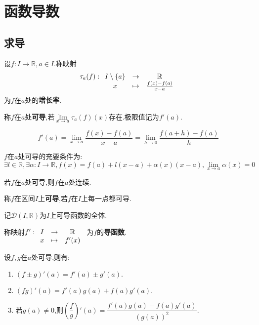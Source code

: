 \chapter{函数导数}

\section{求导}

\begin{deff}
    设$f:I\to\mathbb{R},a\in I$.称映射
    $$
    \tau_a(f):
    \begin{array}[t]{ccc}
        I \setminus \{a\} & \to & \mathbb{R} \\
        x & \mapsto & \frac{f(x)-f(a)}{x-a}
    \end{array}
    $$
    为$f$在$a$处的\textbf{增长率}.
\end{deff}

\begin{deff}
    称$f$在$a$处\textbf{可导},若$\lim\limits_{x \to a}\tau_a(f)(x)$存在.极限值记为$f'(a)$.
\end{deff}

\begin{rqq}
    \[ f'(a)=\lim\limits_{x\to a}\frac{f(x)-f(a)}{x-a}=\lim\limits_{h\to0}\frac{f(a+h)-f(a)}{h} \]
\end{rqq}

\begin{prop}
    $f$在$a$处可导的充要条件为:$$\exists l \in \mathbb{R}, \exists \alpha: I \to \mathbb{R}, 
    f(x)=f(a)+l(x-a)+\alpha(x)(x-a),\lim\limits_{x \to a} \alpha(x)=0$$
\end{prop}

\begin{prop}
    若$f$在$a$处可导,则$f$在$a$处连续.
\end{prop}

\begin{deff}
    称$f$在区间$I$上\textbf{可导},若$f$在$I$上每一点都可导.

    记$\mathcal{D}(I,\mathbb{R})$为$I$上可导函数的全体.
\end{deff}

\begin{deff}
    称映射$f':\begin{array}[t]{ccc} I & \to & \mathbb{R} \\ x & \mapsto & f'(x) \end{array}$
    为$f$的\textbf{导函数}.
\end{deff}

\begin{prop}
    设$f,g$在$a$处可导,则有:
    \begin{enumerate}
        \item $(f \pm g)'(a)=f'(a) \pm g'(a)$.
        \item $(fg)'(a)=f'(a)g(a)+f(a)g'(a)$.
        \item 若$g(a) \neq 0$,则$\left(\dfrac{f}{g}\right)'(a)=\dfrac{f'(a)g(a)-f(a)g'(a)}{(g(a))^2}$.
    \end{enumerate}
\end{prop}


